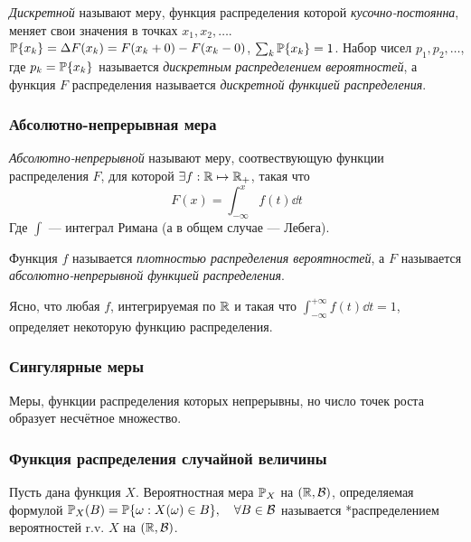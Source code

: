 \emph{Дискретной} называют меру, функция распределения которой
\emph{кусочно-постоянна}, меняет свои значения в точках
\(x_1, x_2, \ldots\).
\(\mathbb P\{x_k\} = \Delta F(x_k) = F(x_k+0) - F(x_k-0)\),
\(\sum_k \mathbb P \{x_k\} = 1\). Набор чисел \(p_1, p_2, \ldots\), где
\(p_k = \mathbb P \{x_k\}\) называется \emph{дискретным распределением
вероятностей}, а функция \(F\) распределения называется \emph{дискретной
функцией распределения}.

\subsubsection{Абсолютно-непрерывная
мера}\label{ux430ux431ux441ux43eux43bux44eux442ux43dux43e-ux43dux435ux43fux440ux435ux440ux44bux432ux43dux430ux44f-ux43cux435ux440ux430}

\emph{Абсолютно-непрерывной} называют меру, соотвествующую функции
распределения \(F\), для которой \(\exists f:\mathbb R\mapsto\mathbb R_+\), такая
что \[ F(x) = \int_{-\infty}^x f(t) \dd t\] Где \(\int\) --- интеграл
Римана (а в общем случае --- Лебега).

Функция \(f\) называется \emph{плотностью распределения вероятностей}, а
\(F\) называется \emph{абсолютно-непрерывной функцией распределения}.

Ясно, что любая \(f\), интегрируемая по \(\mathbb R\) и такая что
\(\int_{-\infty}^{+\infty} f(t) \dd t = 1\), определяет некоторую
функцию распределения.

\subsubsection{Сингулярные
меры}\label{ux441ux438ux43dux433ux443ux43bux44fux440ux43dux44bux435-ux43cux435ux440ux44b}

Меры, функции распределения которых непрерывны, но число точек роста
образует несчётное множество.

\subsubsection{Функция распределения случайной
величины}\label{ux444ux443ux43dux43aux446ux438ux44f-ux440ux430ux441ux43fux440ux435ux434ux435ux43bux435ux43dux438ux44f-ux441ux43bux443ux447ux430ux439ux43dux43eux439-ux432ux435ux43bux438ux447ux438ux43dux44b}

Пусть дана функция \(X\). Вероятностная мера \(\mathbb P_X\) на
\((\mathbb R, \mathcal B)\), определяемая формулой
\(\mathbb P_X (B) = \mathbb P\{\omega: X(\omega)\in B\},\quad \forall B\in\mathcal B\)
называется *распределением вероятностей r.v. \(X\) на \((\mathbb R, \mathcal B)\).

